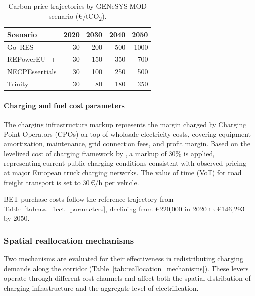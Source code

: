         \begin{table}[H]
            \centering
            \caption{Carbon price trajectories by GENeSYS-MOD scenario (\euro/tCO\textsubscript{2}).}
            \label{tab:carbon_trajectories}
            \begin{tabular}{@{}lrrrr@{}}
            \toprule
            \textbf{Scenario} & \textbf{2020} & \textbf{2030} & \textbf{2040} & \textbf{2050} \\ \midrule
            Go~RES & 30 & 200 & 500 & 1000 \\
            REPowerEU++  & 30 & 150 & 350 & 700 \\
            NECPEssentials  & 30 & 100 & 250 & 500 \\
            Trinity  & 30 & 80 & 180 & 350 \\ \bottomrule
            \end{tabular}
        \end{table}

        \paragraph*{Charging and fuel cost parameters}
        The charging infrastructure markup represents the margin charged by Charging Point Operators (CPOs) on top of wholesale electricity costs, covering equipment amortization, maintenance, grid connection fees, and profit margin. Based on the levelized cost of charging framework by \citet{Lanz2022}, a markup of 30\% is applied, representing current public charging conditions consistent with observed pricing at major European truck charging networks. The value of time (VoT) for road freight transport is set to 30\,\euro/h per vehicle.

        \ac{BET} purchase costs follow the reference trajectory from Table~\ref{tab:ass_fleet_parameters}, declining from \euro220,000 in 2020 to \euro146,293 by 2050.

    \subsubsection{Spatial reallocation mechanisms}
        Two mechanisms are evaluated for their effectiveness in redistributing charging demands along the corridor (Table~\ref{tab:reallocation_mechanisms}). These levers operate through different cost channels and affect both the spatial distribution of charging infrastructure and the aggregate level of electrification.

